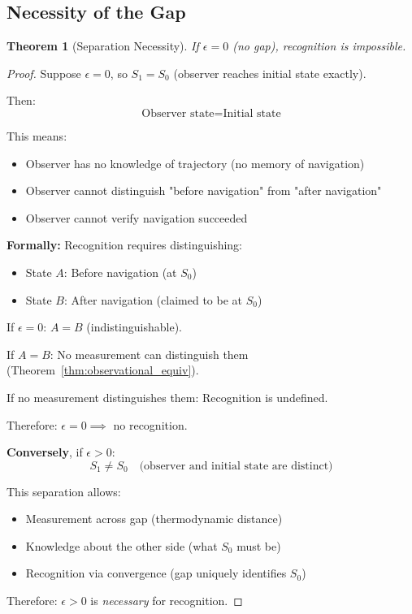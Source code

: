 \documentclass[twocolumn,10pt]{article}
\newtheorem{theorem}{Theorem}[section]
\theoremstyle{definition}
\theoremstyle{remark}
\begin{document}
\subsection{Necessity of the Gap}

\begin{theorem}[Separation Necessity]
\label{thm:separation_necessity}
If $\epsilon = 0$ (no gap), recognition is impossible.
\end{theorem}

\begin{proof}
Suppose $\epsilon = 0$, so $S_1 = S_0$ (observer reaches initial state exactly).

Then:
\begin{equation}
\text{Observer state} = \text{Initial state}
\end{equation}

This means:
\begin{itemize}
\item Observer has no knowledge of trajectory (no memory of navigation)
\item Observer cannot distinguish "before navigation" from "after navigation"
\item Observer cannot verify navigation succeeded
\end{itemize}

\vspace{0.2cm}
\noindent\textbf{Formally:} Recognition requires distinguishing:
\begin{itemize}
\item State $A$: Before navigation (at $S_0$)
\item State $B$: After navigation (claimed to be at $S_0$)
\end{itemize}

If $\epsilon = 0$: $A = B$ (indistinguishable).

If $A = B$: No measurement can distinguish them (Theorem~\ref{thm:observational_equiv}).

If no measurement distinguishes them: Recognition is undefined.

Therefore: $\epsilon = 0 \implies$ no recognition.

\vspace{0.2cm}
\noindent\textbf{Conversely}, if $\epsilon > 0$:
\begin{equation}
S_1 \neq S_0 \quad \text{(observer and initial state are distinct)}
\end{equation}

This separation allows:
\begin{itemize}
\item Measurement across gap (thermodynamic distance)
\item Knowledge about the other side (what $S_0$ must be)
\item Recognition via convergence (gap uniquely identifies $S_0$)
\end{itemize}

Therefore: $\epsilon > 0$ is \textit{necessary} for recognition.
\end{proof}
\end{document}
